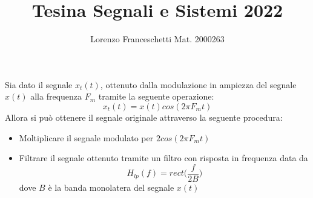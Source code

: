 \documentclass[12pt]{article}
\title{Tesina Segnali e Sistemi 2022}
\author{Lorenzo Franceschetti Mat. 2000263}
\date{}
\begin{document}
\maketitle

Sia dato il segnale $x_{t}(t)$, ottenuto dalla modulazione in ampiezza del segnale $x(t)$ alla frequenza $F_{m}$ tramite la seguente operazione: 
\begin{equation}
	x_{t}(t) = x(t) cos(2\pi F_{m}t)
\end{equation} 
Allora si può ottenere il segnale originale attraverso la seguente procedura:
\begin{itemize}
	\item Moltiplicare il segnale modulato per $2cos(2\pi F_{m}t)$
	\item Filtrare il segnale ottenuto tramite un filtro con risposta in frequenza data da
	\begin{equation}
		H_{lp}(f) = rect \biggl(\frac{f}{2B}\biggr)
	\end{equation}
	dove $B$ è la banda monolatera del segnale $x(t)$
\end{itemize}
\end{document}
